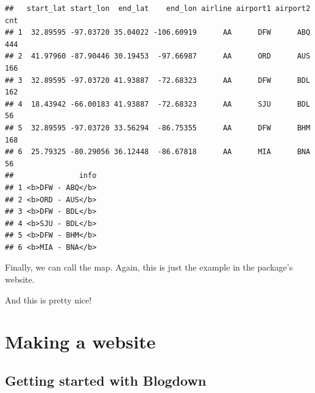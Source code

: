 \documentclass[
]{book}
\newenvironment{Shaded}{\begin{snugshade}}{\end{snugshade}}
\newcommand{\DataTypeTok}[1]{\textcolor[rgb]{0.13,0.29,0.53}{#1}}
\newcommand{\KeywordTok}[1]{\textcolor[rgb]{0.13,0.29,0.53}{\textbf{#1}}}
\newcommand{\NormalTok}[1]{#1}
\newcommand{\OperatorTok}[1]{\textcolor[rgb]{0.81,0.36,0.00}{\textbf{#1}}}
\newcommand{\StringTok}[1]{\textcolor[rgb]{0.31,0.60,0.02}{#1}}
\begin{document}
\begin{verbatim}
##   start_lat start_lon  end_lat    end_lon airline airport1 airport2 cnt
## 1  32.89595 -97.03720 35.04022 -106.60919      AA      DFW      ABQ 444
## 2  41.97960 -87.90446 30.19453  -97.66987      AA      ORD      AUS 166
## 3  32.89595 -97.03720 41.93887  -72.68323      AA      DFW      BDL 162
## 4  18.43942 -66.00183 41.93887  -72.68323      AA      SJU      BDL  56
## 5  32.89595 -97.03720 33.56294  -86.75355      AA      DFW      BHM 168
## 6  25.79325 -80.29056 36.12448  -86.67818      AA      MIA      BNA  56
##               info
## 1 <b>DFW - ABQ</b>
## 2 <b>ORD - AUS</b>
## 3 <b>DFW - BDL</b>
## 4 <b>SJU - BDL</b>
## 5 <b>DFW - BHM</b>
## 6 <b>MIA - BNA</b>
\end{verbatim}

Finally, we can call the map. Again, this is just the example in the package's website.

\begin{Shaded}
\end{Shaded}

And this is pretty nice!

\hypertarget{making-a-website}{%
\chapter{Making a website}\label{making-a-website}}

\hypertarget{getting-started-with-blogdown}{%
\section{Getting started with Blogdown}\label{getting-started-with-blogdown}}
\end{document}
